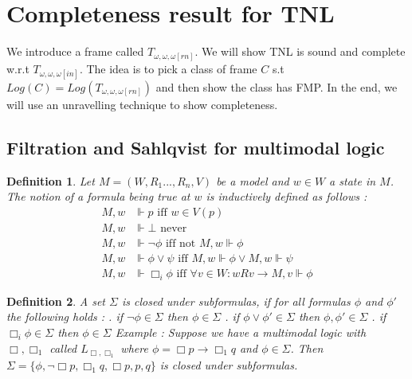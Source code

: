 \documentclass[12pt, a4paper]{scrartcl}
\newtheorem{definition}{Definition}[subsection]
\begin{document}
\section{Completeness result for TNL}

We introduce a frame called $T_{\omega, \omega, \omega[rn]}$. We will show TNL is sound and complete w.r.t $T_{\omega, \omega, \omega[in]}$.
The idea is to pick a class of frame $C$ s.t $Log(C) = Log(T_{\omega, \omega, \omega[rn]})$ and then show the class has FMP.
In the end, we will use an unravelling technique to show completeness. 

\subsection{Filtration and Sahlqvist for multimodal logic}

\begin{definition}
    Let $M = (W,R_1...,R_n,V)$ be a model and $w \in W$ a state in $M$. The notion of a formula being true at $w$ is inductively defined as follows :
    \begin{align*}
        M, w &\Vdash p \mbox{ iff } w \in V(p) \\
        M, w &\Vdash \bot  \mbox{ never } \\
        M, w &\Vdash \neg \phi \mbox{ iff not } M, w \Vdash \phi \\ 
        M, w &\Vdash \phi \lor \psi \mbox{ iff } M,w \Vdash \phi \lor M,w \Vdash \psi \\
        M, w &\Vdash \Box_i \phi \mbox{ iff } \forall v \in W : wRv \rightarrow M, v \Vdash \phi
    \end{align*}

\end{definition}

\begin{definition}
    A set $\Sigma$ is closed under subformulas, if for all formulas $\phi$ and $\phi'$ the following holds :
    \newline {}. if $\neg \phi \in \Sigma$ then $\phi \in \Sigma$
    . if $\phi \lor \phi' \in \Sigma$ then $\phi, \phi' \in \Sigma$
    . if $\Box_i \phi \in \Sigma$ then $\phi \in \Sigma$
    \newline
    \newline
    Example : Suppose we have a multimodal logic with $\Box, \Box_1$ called $L_{\Box, \Box_1}$ where $\phi = \Box p \rightarrow \Box_1 q$ and $\phi \in \Sigma$. Then $\Sigma = \{ \phi, \neg\Box p, \Box_1 q, \Box p, p, q\}$ is closed under
    subformulas.
\end{definition}
\end{document}
